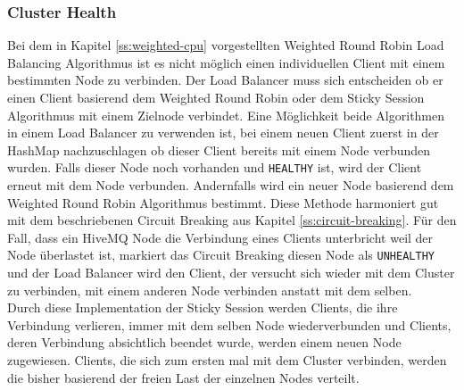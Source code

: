 \subsubsection{Cluster Health}
Bei dem in Kapitel \ref{ss:weighted-cpu} vorgestellten Weighted Round Robin Load Balancing Algorithmus ist es nicht möglich einen individuellen Client mit einem bestimmten Node zu verbinden. Der Load Balancer muss sich entscheiden ob er einen Client basierend dem Weighted Round Robin oder dem Sticky Session Algorithmus mit einem Zielnode verbindet.
Eine Möglichkeit beide Algorithmen in einem Load Balancer zu verwenden ist, bei einem neuen Client zuerst in der HashMap nachzuschlagen ob dieser Client bereits mit einem Node verbunden wurden. Falls dieser Node noch vorhanden und \verb|HEALTHY| ist, wird der Client erneut mit dem Node verbunden. Andernfalls wird ein neuer Node basierend dem Weighted Round Robin Algorithmus bestimmt.
Diese Methode harmoniert gut mit dem beschriebenen Circuit Breaking aus Kapitel \ref{ss:circuit-breaking}. Für den Fall, dass ein HiveMQ Node die Verbindung eines Clients unterbricht weil der Node überlastet ist, markiert das Circuit Breaking diesen Node als \verb|UNHEALTHY| und der Load Balancer wird den Client, der versucht sich wieder mit dem Cluster zu verbinden, mit einem anderen Node verbinden anstatt mit dem selben.
\\
Durch diese Implementation der Sticky Session werden Clients, die ihre Verbindung verlieren, immer mit dem selben Node wiederverbunden und Clients, deren Verbindung absichtlich beendet wurde, werden einem neuen Node zugewiesen. Clients, die sich zum ersten mal mit dem Cluster verbinden, werden die bisher basierend der freien Last der einzelnen Nodes verteilt.
\newpage

